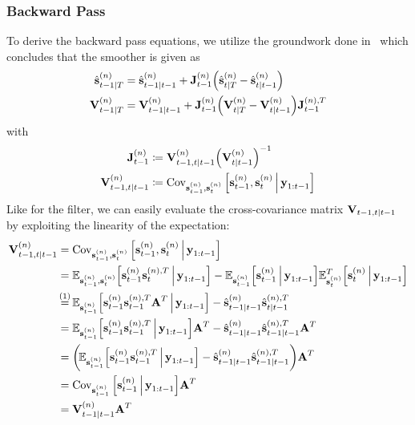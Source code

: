 	\subsubsection{Backward Pass}
		To derive the backward pass equations, we utilize the groundwork done in~\cite{deisenrothProbabilisticPerspectiveGaussian2011} which concludes that the smoother is given as
		\begin{align*}
			\hat{\boldsymbol{\mathrm{s}}}_{t - 1 \vert T}^{(n)} &= \hat{\boldsymbol{\mathrm{s}}}_{t - 1 \vert t - 1}^{(n)} + \boldsymbol{\mathrm{J}}_{t - 1}^{(n)} \Big(\hat{\boldsymbol{\mathrm{s}}}_{t \vert T}^{(n)} - \hat{\boldsymbol{\mathrm{s}}}_{t \vert t - 1}^{(n)}\Big) \\
			\boldsymbol{\mathrm{V}}_{t - 1 \vert T}^{(n)}       &= \boldsymbol{\mathrm{V}}_{t - 1 \vert t - 1}^{(n)} + \boldsymbol{\mathrm{J}}_{t - 1}^{(n)} \Big(\boldsymbol{\mathrm{V}}_{t \vert T}^{(n)} - \boldsymbol{\mathrm{V}}_{t \vert t - 1}^{(n)}\Big) \boldsymbol{\mathrm{J}}_{t - 1}^{(n), T}
		\end{align*}
		with
		\begin{align}
			\boldsymbol{\mathrm{J}}_{t - 1}^{(n)}                    &\coloneqq \boldsymbol{\mathrm{V}}_{t - 1, t \vert t - 1}^{(n)} \Big(\boldsymbol{\mathrm{V}}_{t \vert t - 1}^{(n)}\Big)^{-1}  \nonumber \\
			\boldsymbol{\mathrm{V}}_{t - 1, t \vert t - 1}^{(n)} &\coloneqq \operatorname{Cov}_{\boldsymbol{\mathrm{s}}_{t - 1}^{(n)}, \boldsymbol{\mathrm{s}}_t^{(n)}}\Big[\boldsymbol{\mathrm{s}}_{t - 1}^{(n)}, \boldsymbol{\mathrm{s}}_t^{(n)} \,\Big\vert\, \boldsymbol{\mathrm{y}}_{1:t - 1}\Big]  \label{eq:smootherPriorCrossCov}
		\end{align}
		Like for the filter, we can easily evaluate the cross-covariance matrix \( \boldsymbol{\mathrm{V}}_{t - 1, t \vert t - 1} \) by exploiting the linearity of the expectation:
		\begin{align*}
			\mat{V}_{t - 1, t \subgiven t - 1}^{(n)}
				&= \Cov_{\vec{s}_{t - 1}^{(n)}, \vec{s}_t^{(n)}}\Big[\vec{s}_{t - 1}^{(n)}, \vec{s}_t^{(n)} \Biggiven \vec{y}_{1:t - 1}\Big] \\
				&= \E_{\vec{s}_{t - 1}^{(n)}, \vec{s}_t^{(n)}}\Big[\vec{s}_{t - 1}^{(n)} \vec{s}_t^{(n), T} \Biggiven \vec{y}_{1:t - 1}\Big] - \E_{\vec{s}_{t - 1}^{(n)}}\Big[\vec{s}_{t - 1}^{(n)} \Biggiven \vec{y}_{1:t - 1}\Big] \E_{\vec{s}_t^{(n)}}^T\Big[\vec{s}_t^{(n)} \Biggiven \vec{y}_{1:t - 1}\Big] \\
				&\oversetfootnotemark{=} \E_{\vec{s}_{t - 1}^{(n)}}\Big[\vec{s}_{t - 1}^{(n)} \vec{s}_{t - 1}^{(n), T} \mat{A}^T \Biggiven \vec{y}_{1:t - 1}\Big] - \hat{\vec{s}}_{t - 1 \subgiven t - 1}^{(n)} \hat{\vec{s}}_{t \subgiven t - 1}^{(n), T} \\
				&= \E_{\vec{s}_{t - 1}^{(n)}}\Big[\vec{s}_{t - 1}^{(n)} \vec{s}_{t - 1}^{(n), T} \Biggiven \vec{y}_{1:t - 1}\Big] \mat{A}^T - \hat{\vec{s}}_{t - 1 \subgiven t - 1}^{(n)} \hat{\vec{s}}_{t - 1 \subgiven t - 1}^{(n), T} \mat{A}^T \\
				&= \bigg(\! \E_{\vec{s}_{t - 1}^{(n)}}\Big[\vec{s}_{t - 1}^{(n)} \vec{s}_{t - 1}^{(n), T} \Biggiven \vec{y}_{1:t - 1}\Big] - \hat{\vec{s}}_{t - 1 \subgiven t - 1}^{(n)} \hat{\vec{s}}_{t - 1 \subgiven t - 1}^{(n), T} \bigg) \mat{A}^T \\
				&= \Cov_{\vec{s}_{t - 1}^{(n)}}\Big[\vec{s}_{t - 1}^{(n)} \Biggiven \vec{y}_{1:t - 1}\Big] \mat{A}^T \\
				&= \mat{V}_{t - 1 \subgiven t - 1}^{(n)} \mat{A}^T
		\end{align*}
